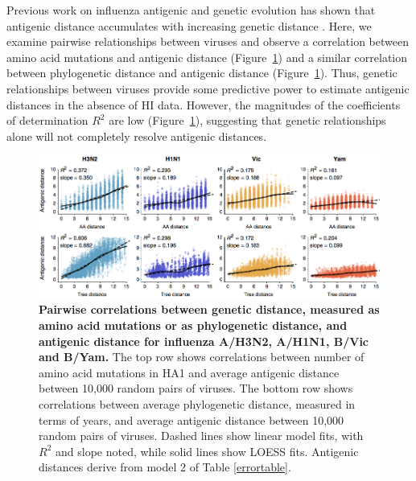 \documentclass[11pt,oneside,letterpaper]{article}
\begin{document}
Previous work on influenza antigenic and genetic evolution has shown that antigenic distance accumulates with increasing genetic distance \cite{Hay01, Smith04, Russell08}.
Here, we examine pairwise relationships between viruses and observe a correlation between amino acid mutations and antigenic distance (Figure~\ref{seq_grid}) and a similar correlation between phylogenetic distance and antigenic distance (Figure~\ref{seq_grid}).
Thus, genetic relationships between viruses provide some predictive power to estimate antigenic distances in the absence of HI data.
However, the magnitudes of the coefficients of determination $R^2$ are low (Figure~\ref{seq_grid}), suggesting that genetic relationships alone will not completely resolve antigenic distances.

\begin{figure}[h]
	\centering		
	\includegraphics[width=1.0\textwidth]{figures/seq_grid}
	\caption{\textbf{Pairwise correlations between genetic distance, measured as amino acid mutations or as phylogenetic distance, and antigenic distance for influenza A/H3N2, A/H1N1, B/Vic and B/Yam.} 
	The top row shows correlations between number of amino acid mutations in HA1 and average antigenic distance between 10,000 random pairs of viruses.
	The bottom row shows correlations between average phylogenetic distance, measured in terms of years, and average antigenic distance between 10,000 random pairs of viruses.
	Dashed lines show linear model fits, with $R^2$ and slope noted, while solid lines show LOESS fits.
	Antigenic distances derive from model 2 of Table \ref{errortable}.
	} 
	\label{seq_grid} 
\end{figure}
\end{document}
